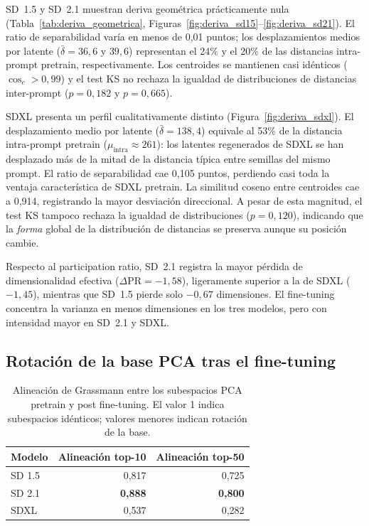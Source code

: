 \documentclass[12pt, a4paper, twoside]{book}
\begin{document}
SD~1.5 y SD~2.1 muestran deriva geométrica prácticamente nula (Tabla~\ref{tab:deriva_geometrica},
Figuras~\ref{fig:deriva_sd15}--\ref{fig:deriva_sd21}).
El ratio de separabilidad varía en menos de 0,01 puntos; los desplazamientos medios por latente
($\bar{\delta} = 36{,}6$ y $39{,}6$) representan el 24\% y el 20\% de las distancias intra-prompt
pretrain, respectivamente. Los centroides se mantienen casi idénticos ($\cos_c > 0{,}99$) y el
test KS no rechaza la igualdad de distribuciones de distancias inter-prompt ($p = 0{,}182$ y
$p = 0{,}665$).

SDXL presenta un perfil cualitativamente distinto (Figura~\ref{fig:deriva_sdxl}).
El desplazamiento medio por latente ($\bar{\delta} = 138{,}4$) equivale al 53\% de la distancia
intra-prompt pretrain ($\mu_\text{intra} \approx 261$): los latentes regenerados de SDXL se han
desplazado más de la mitad de la distancia típica entre semillas del mismo prompt.
El ratio de separabilidad cae 0,105 puntos, perdiendo casi toda la ventaja característica de
SDXL pretrain.
La similitud coseno entre centroides cae a 0,914, registrando la mayor desviación direccional.
A pesar de esta magnitud, el test KS tampoco rechaza la igualdad de distribuciones
($p = 0{,}120$), indicando que la \emph{forma} global de la distribución de distancias se
preserva aunque su posición cambie.

Respecto al participation ratio, SD~2.1 registra la mayor pérdida de dimensionalidad efectiva
($\Delta\text{PR} = -1{,}58$), ligeramente superior a la de SDXL ($-1{,}45$), mientras que
SD~1.5 pierde solo $-0{,}67$ dimensiones. El fine-tuning concentra la varianza en menos
dimensiones en los tres modelos, pero con intensidad mayor en SD~2.1 y SDXL.

\subsection{Rotación de la base PCA tras el fine-tuning}
\label{subsec:res:pca_alineacion}

\begin{table}[htb]
\centering
\caption{Alineación de Grassmann entre los subespacios PCA pretrain y post fine-tuning.
El valor 1 indica subespacios idénticos; valores menores indican rotación de la base.}
\label{tab:pca_alineacion}
\small
\begin{tabular}{lrr}
\toprule
\textbf{Modelo} & \textbf{Alineación top-10} & \textbf{Alineación top-50} \\
\midrule
SD 1.5 & 0,817 & 0,725 \\
SD 2.1 & \textbf{0,888} & \textbf{0,800} \\
SDXL   & 0,537 & 0,282 \\
\bottomrule
\end{tabular}
\end{table}
\end{document}
